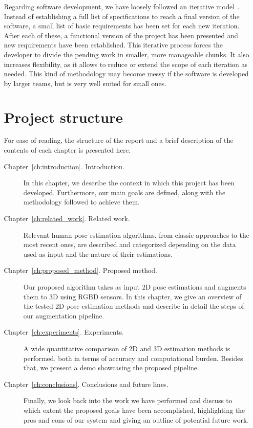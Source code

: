 Regarding software development, we have loosely followed an iterative model~\cite{larman2003iterative}. Instead of establishing a full list of specifications to reach a final version of the software, a small list of basic requirements has been set for each new iteration. After each of these, a functional version of the project has been presented and new requirements have been established. This iterative process forces the developer to divide the pending work in smaller, more manageable chunks. It also increases flexibility, as it allows to reduce or extend the scope of each iteration as needed. This kind of methodology may become messy if the software is developed by larger teams, but is very well suited for small ones.

\section{Project structure}\label{ch:project_structure}
For ease of reading, the structure of the report and a brief description of the contents of each chapter is presented here.

\begin{description}
\item[Chapter~\ref{ch:introduction}. Introduction.] In this chapter, we describe the context in which this project has been developed. Furthermore, our main goals are defined, along with the methodology followed to achieve them.
\item[Chapter~\ref{ch:related_work}. Related work.] Relevant human pose estimation algorithms, from classic approaches to the most recent ones, are described and categorized depending on the data used as input and the nature of their estimations.
\item[Chapter~\ref{ch:proposed_method}. Proposed method.] Our proposed algorithm takes as input 2D pose estimations and augments them to 3D using RGBD sensors. In this chapter, we give an overview of the tested 2D pose estimation methods and describe in detail the steps of our augmentation pipeline.
\item[Chapter~\ref{ch:experiments}. Experiments.] A wide quantitative comparison of 2D and 3D estimation methods is performed, both in terms of accuracy and computational burden. Besides that, we present a demo showcasing the proposed pipeline.
\item[Chapter~\ref{ch:conclusions}. Conclusions and future lines.] Finally, we look back into the work we have performed and discuss to which extent the proposed goals have been accomplished, highlighting the pros and cons of our system and giving an outline of potential future work.
\end{description}